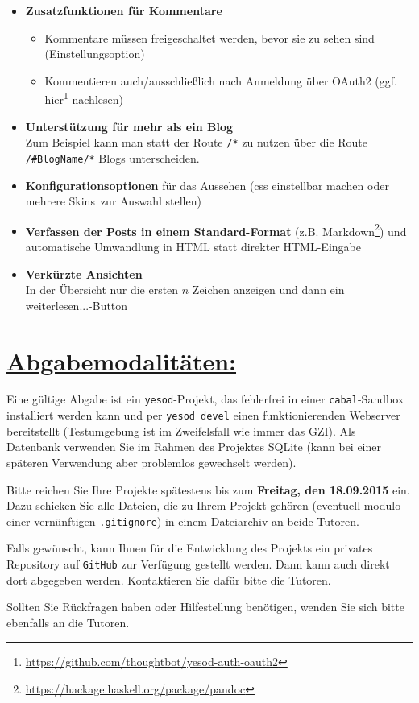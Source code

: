 \documentclass[10pt,a4paper]{article}
\begin{document}
\begin{itemize}
 \item \textbf{Zusatzfunktionen für Kommentare}
       \begin{itemize}
        \item Kommentare müssen freigeschaltet werden, bevor sie zu sehen sind (Einstellungsoption)
        \item Kommentieren auch/ausschließlich nach Anmeldung über OAuth2 (ggf. hier\footnote{\url{https://github.com/thoughtbot/yesod-auth-oauth2}} nachlesen)
       \end{itemize}
 \item \textbf{Unterstützung für mehr als ein Blog}\\
       Zum Beispiel kann man statt der Route \texttt{/*} zu nutzen über die Route \texttt{/\#BlogName/*} Blogs unterscheiden.
 \item \textbf{Konfigurationsoptionen} für das Aussehen (css einstellbar machen oder mehrere \glqq Skins\grqq \ zur Auswahl stellen)
 \item \textbf{Verfassen der Posts in einem Standard-Format} (z.B. Markdown\footnote{\url{https://hackage.haskell.org/package/pandoc}}) und automatische Umwandlung in HTML statt direkter HTML-Eingabe
 \item \textbf{Verkürzte Ansichten}\\ In der Übersicht nur die ersten $n$ Zeichen anzeigen und dann ein \glqq weiterlesen...\grqq-Button
\end{itemize}

\section*{\underline{Abgabemodalitäten:}}

Eine gültige Abgabe ist ein \texttt{yesod}-Projekt, das fehlerfrei in einer \texttt{cabal}-Sandbox installiert werden kann und per \texttt{yesod devel} einen funktionierenden Webserver bereitstellt (Testumgebung ist im Zweifelsfall wie immer das GZI). Als Datenbank verwenden Sie im Rahmen des Projektes SQLite (kann bei einer späteren Verwendung aber problemlos gewechselt werden).

Bitte reichen Sie Ihre Projekte spätestens bis zum \textbf{Freitag, den 18.09.2015} ein.
Dazu schicken Sie alle Dateien, die zu Ihrem Projekt gehören (eventuell modulo einer vernünftigen \texttt{.gitignore}) in einem Dateiarchiv an beide Tutoren.\bigskip

Falls gewünscht, kann Ihnen für die Entwicklung des Projekts ein privates Repository auf \texttt{GitHub} zur Verfügung gestellt werden. Dann kann auch direkt dort abgegeben werden. Kontaktieren Sie dafür bitte die Tutoren.\bigskip

Sollten Sie Rückfragen haben oder Hilfestellung benötigen, wenden Sie sich bitte ebenfalls an die Tutoren.
\end{document}
